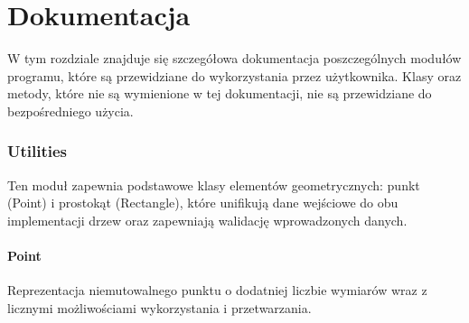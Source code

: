 \documentclass{lab}
\begin{document}
\part{Dokumentacja}
W tym rozdziale znajduje się szczegółowa dokumentacja poszczególnych modułów programu, które są przewidziane do wykorzystania przez użytkownika. Klasy oraz metody, które nie są wymienione w tej dokumentacji, nie są przewidziane do bezpośredniego użycia.
\section{Utilities}
Ten moduł zapewnia podstawowe klasy elementów geometrycznych: punkt (Point) i prostokąt (Rectangle), które unifikują dane wejściowe do obu implementacji drzew oraz zapewniają walidację wprowadzonych danych.
\subsection{Point}
Reprezentacja niemutowalnego punktu o dodatniej liczbie wymiarów wraz z licznymi możliwościami wykorzystania i przetwarzania.
\end{document}
